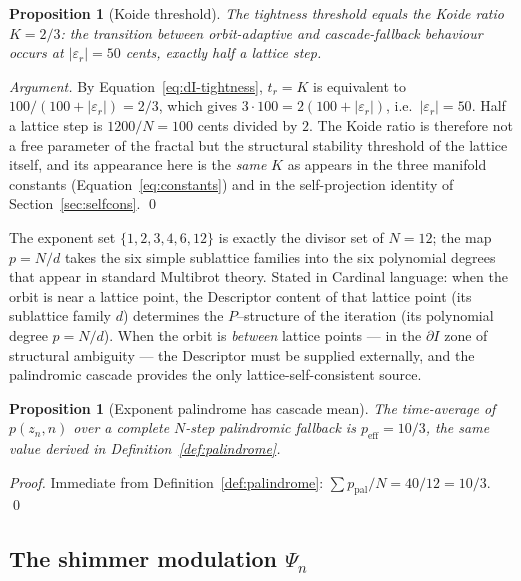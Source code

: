 \documentclass[11pt,a4paper]{article}
\newtheorem{proposition}[theorem]{Proposition}
\theoremstyle{definition}
\theoremstyle{remark}
\begin{document}
\begin{proposition}[Koide threshold]\label{prop:koide-threshold}
The tightness threshold equals the Koide ratio $K=2/3$: the transition between orbit-adaptive and cascade-fallback behaviour occurs at $|\varepsilon_{r}| = 50$ cents, exactly half a lattice step.
\end{proposition}

\begin{proof}[Argument]
By Equation~\eqref{eq:dI-tightness}, $t_{r} = K$ is equivalent to $100/(100+|\varepsilon_{r}|) = 2/3$, which gives $3\cdot 100 = 2(100+|\varepsilon_{r}|)$, i.e.\ $|\varepsilon_{r}|=50$. Half a lattice step is $1200/N = 100$ cents divided by $2$. The Koide ratio is therefore not a free parameter of the fractal but the structural stability threshold of the lattice itself, and its appearance here is the \emph{same} $K$ as appears in the three manifold constants (Equation~\eqref{eq:constants}) and in the self-projection identity of Section~\ref{sec:selfcons}. \qed
\end{proof}

The exponent set $\{1,2,3,4,6,12\}$ is exactly the divisor set of $N=12$; the map $p = N/d$ takes the six simple sublattice families into the six polynomial degrees that appear in standard Multibrot theory. Stated in Cardinal language: when the orbit is near a lattice point, the Descriptor content of that lattice point (its sublattice family $d$) determines the $P$--structure of the iteration (its polynomial degree $p = N/d$). When the orbit is \emph{between} lattice points --- in the $\partial I$ zone of structural ambiguity --- the Descriptor must be supplied externally, and the palindromic cascade provides the only lattice-self-consistent source.

\begin{proposition}[Exponent palindrome has cascade mean]\label{prop:dI-peff}
The time-average of $p(z_{n},n)$ over a complete $N$-step palindromic fallback is $p_{\mathrm{eff}}=10/3$, the same value derived in Definition~\ref{def:palindrome}.
\end{proposition}
\begin{proof}
Immediate from Definition~\ref{def:palindrome}: $\sum p_{\mathrm{pal}}/N = 40/12 = 10/3$. \qed
\end{proof}

\subsection{The shimmer modulation $\Psi_{n}$}\label{subsec:dI-shimmer}
\end{document}
